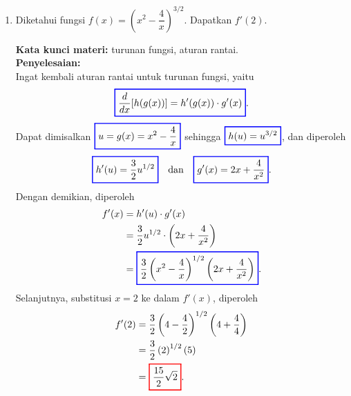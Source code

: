 \documentclass[10pt,openany,a4paper]{article}
\theoremstyle{definition}
\theoremstyle{definition}
\theoremstyle{plain}
\newenvironment{jawab}[2][tes]{%
\par\noindent\textbf{Kata kunci materi:} #1.\\
\textbf{Penyelesaian:} #2%
}{}
\begin{document}
\begin{enumerate}
    \item Diketahui fungsi $f(x)=\left(x^2-\dfrac{4}{x}\right)^{3/2}$. Dapatkan $f'(2)$.
    \begin{jawab}[turunan fungsi, aturan rantai]{~\\
        Ingat kembali aturan rantai untuk turunan fungsi, yaitu
        \[
        \colorlet{oldcolor}{.}
        \color{blue}
        \setlength{\fboxrule}{1pt} \boxed{\color{oldcolor}\frac{d}{dx}[h(g(x))] = h'(g(x)) \cdot g'(x)}\color{oldcolor}.
        \]
        Dapat dimisalkan $\colorlet{oldcolor}{.}
        \color{blue}
        \setlength{\fboxrule}{1pt} \boxed{\color{oldcolor}u=g(x) = x^2-\frac{4}{x}}\color{oldcolor}$ sehingga $\colorlet{oldcolor}{.}
        \color{blue}
        \setlength{\fboxrule}{1pt} \boxed{\color{oldcolor}h(u) = u^{3/2}}\color{oldcolor}$, dan diperoleh
        \begin{align*}
            \colorlet{oldcolor}{.}
        \color{blue}
        \setlength{\fboxrule}{1pt} \boxed{\color{oldcolor}h'(u) = \frac{3}{2}u^{1/2}}\color{oldcolor} \quad \text{dan}\quad
        \colorlet{oldcolor}{.}
        \color{blue}
        \setlength{\fboxrule}{1pt} \boxed{\color{oldcolor}g'(x) = 2x+\frac{4}{x^2}}\color{oldcolor}.
        \end{align*}
        Dengan demikian, diperoleh
        \begin{align*}
            f'(x) &=
            h'(u) \cdot g'(x)\\
            &= \frac{3}{2}u^{1/2} \cdot \left(2x+\frac{4}{x^2}\right)\\
            &= \colorlet{oldcolor}{.}
        \color{blue}
        \setlength{\fboxrule}{1pt} \boxed{\color{oldcolor}\frac{3}{2}\left(x^2-\frac{4}{x}\right)^{1/2} \left(2x+\frac{4}{x^2}\right)}\color{oldcolor}.
        \end{align*}
        Selanjutnya, substitusi $x=2$ ke dalam $f'(x)$, diperoleh
        \begin{align*}
            f'(2) &= \frac{3}{2}\left(4-\frac{4}{2}\right)^{1/2} \left(4+\frac{4}{4}\right)\\
            &= \frac{3}{2}\left(2\right)^{1/2} \left(5\right)\\
            &= \colorlet{oldcolor}{.}
        \color{red}
        \setlength{\fboxrule}{1pt} \boxed{\color{oldcolor}\frac{15}{2}\sqrt{2}}\color{oldcolor}.
        \end{align*}
    }
    \end{jawab}
\end{enumerate}
\end{document}
